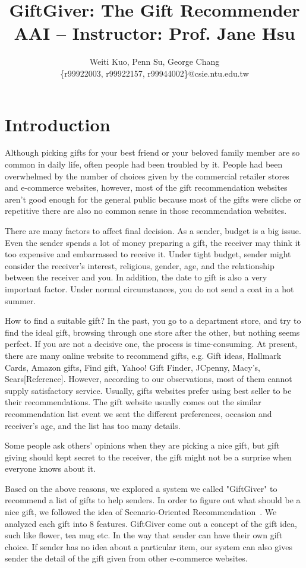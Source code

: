 \documentclass[11pt,twocolumn]{article}
\title{GiftGiver: The Gift Recommender \\ {\small AAI --
    Instructor: Prof. Jane Hsu}}
\author{Weiti Kuo, Penn Su, George Chang \\ \{r99922003, r99922157, r99944002\}@csie.ntu.edu.tw}
\begin{document}
\maketitle

\section{Introduction}

Although picking gifts for your best friend or your beloved family member are so common in daily life, often people had been troubled by it. People had been overwhelmed by the number of choices given by the commercial retailer stores and e-commerce websites, however, most of the gift recommendation websites aren't good enough for the general public because most of the gifts were cliche or repetitive there are also no common sense in those recommendation websites.

There are many factors to affect final decision. As a sender, budget is a big issue. Even the sender spends a lot of money preparing a gift, the receiver may think it too expensive and embarrassed to receive it.   Under tight budget, sender might consider the receiver's interest, religious, gender, age, and the relationship between the receiver and you. In addition, the date to gift is also a very important factor. Under normal circumstances, you do not send a coat in a hot summer.

How to find a suitable gift? In the past, you go to a department store, and try to find the ideal gift, browsing through one store after the other, but nothing seems perfect. If you are not a decisive one, the process is time-consuming. At present, there are many online website to recommend gifts, e.g. Gift ideas, Hallmark Cards, Amazon gifts, Find gift, Yahoo! Gift Finder, JCpenny, Macy's, Sears[Reference]. However, according to our observations, most of them cannot supply satisfactory service. Usually, gifts websites prefer using best seller to be their recommendations. The gift website usually comes out the similar recommendation list event we sent the different preferences, occasion and receiver’s age, and the list has too many details.

Some people ask others' opinions when they are picking a nice gift, but gift giving should kept secret to the receiver, the gift might not be a surprise when everyone knows about it.

Based on the above reasons, we explored a system we called "GiftGiver" to recommend a list of gifts to help senders. In order to figure out what should be a nice gift,  we followed the idea of Scenario-Oriented Recommendation~\cite{Shen}.   We analyzed each gift into 8 features. GiftGiver come out a concept of the gift idea, such like flower, tea mug etc.  In the way that sender can have their own gift choice.  If sender has no idea about a particular item, our system can also gives sender the detail of the gift given from other e-commerce websites.
\end{document}
